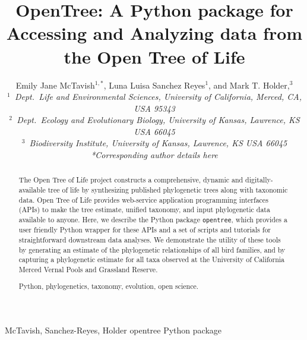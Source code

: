 \documentclass[oupdraft]{sysbio_sse}
\begin{document}
\title{OpenTree: A Python package for Accessing and Analyzing data from the Open Tree of Life}

\author{Emily Jane McTavish$^{1,\ast}$, Luna Luisa Sanchez Reyes$^{1}$, and
Mark T. Holder,$^{3}$\\[4pt]
\textit{$^{1}$~Dept.~Life and Environmental Sciences, University of California, Merced, CA, USA 95343}
\\
\textit{$^{2}$~Dept.~Ecology and Evolutionary Biology, University of Kansas, Lawrence, KS USA 66045}\\
\textit{$^{3}$~Biodiversity Institute, University of Kansas, Lawrence, KS USA 66045}
\\[2pt]
\textit{*Corresponding author details here}}

\markboth%
{McTavish, Sanchez-Reyes, Holder}
{opentree Python package}

\maketitle

\begin{abstract}
{The Open Tree of Life project constructs a comprehensive, dynamic and digitally-available tree of life by synthesizing published phylogenetic trees along with taxonomic data.
Open Tree of Life provides web-service application programming interfaces (APIs) to make the tree estimate, unified taxonomy, and input phylogenetic data available to anyone.
Here, we describe the Python package \texttt{opentree}, which provides a user friendly Python wrapper for these APIs and a set of scripts and tutorials for straightforward downstream data analyses.
We demonstrate the utility of these tools by generating an estimate of the phylogenetic relationships of all bird families, and by capturing a phylogenetic estimate for all taxa  observed at the University of California Merced Vernal Pools and Grassland Reserve.
}

{Python, phylogenetics, taxonomy, evolution, open science.}
\end{abstract}
\newline
\end{document}
